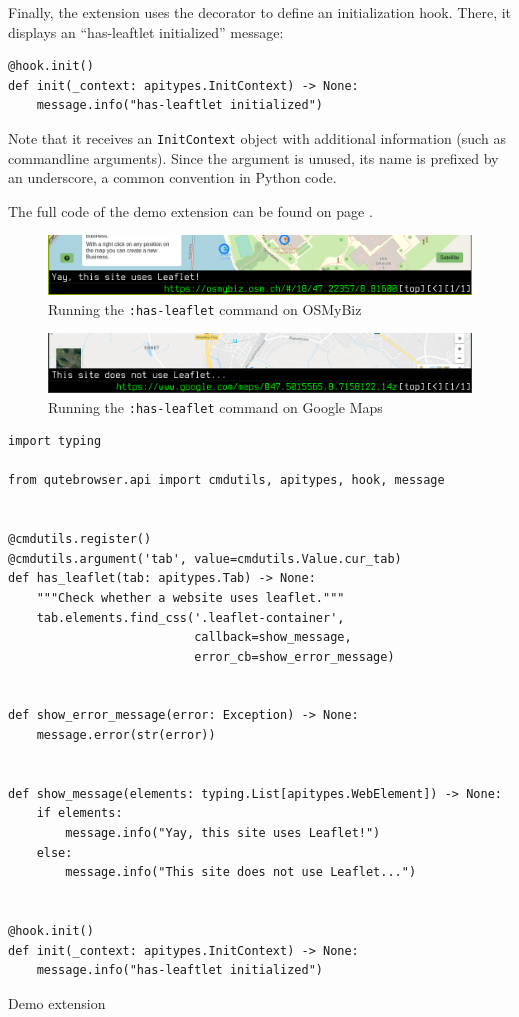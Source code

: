 Finally, the extension uses the  decorator to define an
initialization hook. There, it displays an ``has-leaftlet initialized'' message:

\begin{verbatim}
@hook.init()
def init(_context: apitypes.InitContext) -> None:
    message.info("has-leaftlet initialized")
\end{verbatim}

Note that it receives an \verb|InitContext| object with additional information
(such as commandline arguments). Since the argument is unused, its name is
prefixed by an underscore, a common convention in Python code.

The full code of the demo extension can be found on page \pageref{lst:demo}.\\[2em]

\begin{figure}[H]
  \centering
  \includegraphics[width=\linewidth]{img/screenshot-leaflet.png}
  \caption{Running the \texttt{:has-leaflet} command on OSMyBiz}
\end{figure}

\begin{figure}[H]
  \centering
  \includegraphics[width=\linewidth]{img/screenshot-leaflet-no.png}
  \caption{Running the \texttt{:has-leaflet} command on Google Maps}
\end{figure}


\begin{listing}[p]
\centering
\begin{verbatim}
import typing

from qutebrowser.api import cmdutils, apitypes, hook, message


@cmdutils.register()
@cmdutils.argument('tab', value=cmdutils.Value.cur_tab)
def has_leaflet(tab: apitypes.Tab) -> None:
    """Check whether a website uses leaflet."""
    tab.elements.find_css('.leaflet-container',
                          callback=show_message,
                          error_cb=show_error_message)


def show_error_message(error: Exception) -> None:
    message.error(str(error))


def show_message(elements: typing.List[apitypes.WebElement]) -> None:
    if elements:
        message.info("Yay, this site uses Leaflet!")
    else:
        message.info("This site does not use Leaflet...")


@hook.init()
def init(_context: apitypes.InitContext) -> None:
    message.info("has-leaftlet initialized")
\end{verbatim}
\caption{Demo extension}
\label{lst:demo}
\end{listing}

